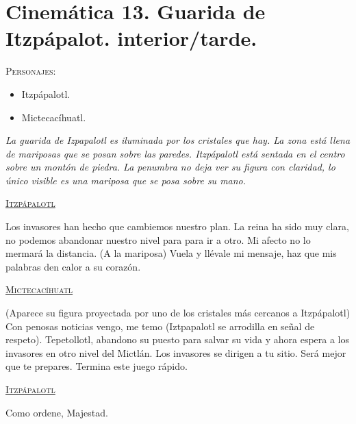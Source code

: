 \section{Cinemática 13. Guarida de Itzpápalot. interior/tarde.} \label{Cin:Cinematica13}
 \textsc{Personajes}:
 \begin{itemize}
 \item Itzpápalotl.
 \item Mictecacíhuatl.
 \end{itemize}
 \textit{La guarida de Izpapalotl es iluminada por los cristales que hay. La zona está llena de mariposas que se posan sobre las paredes. Itzpápalotl está sentada en el centro sobre un montón de piedra. La penumbra no deja ver su figura con claridad, lo único visible es una mariposa que se posa sobre su mano.}
 \begin{center}
 \textsc{\underline{Itzpápalotl}}
 \\
\par
Los invasores han hecho que cambiemos nuestro plan. La reina ha sido muy clara, no podemos abandonar nuestro nivel para para ir a otro. Mi afecto no lo mermará la distancia. (A la mariposa) Vuela y llévale mi mensaje, haz que mis palabras den calor a su corazón.
\\
\par
\textsc{\underline{Mictecacíhuatl}}
\\
\par
(Aparece su figura proyectada por uno de los cristales más cercanos a Itzpápalotl) Con penosas noticias vengo, me temo (Iztpapalotl se arrodilla en señal de respeto). Tepetollotl, abandono su puesto para salvar su vida y ahora espera a los invasores en otro nivel del Mictlán. Los invasores se dirigen a tu sitio. Será mejor que te prepares. Termina este juego rápido.
\\
\par
\textsc{\underline{Itzpápalotl}}
\\
\par
Como ordene, Majestad. 
 \end{center}
